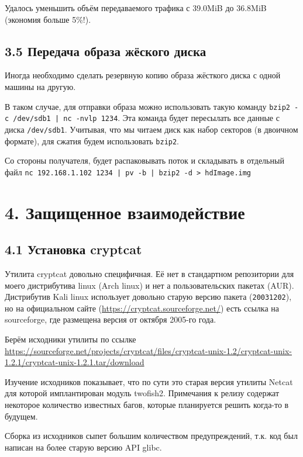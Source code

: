 Удалось уменьшить объём передаваемого трафика с 39.0MiB до 36.8MiB (экономия больше 5\%!).

\subsection*{3.5 Передача образа жёского диска}

Иногда необходимо сделать резервную копию образа жёсткого диска с одной машины на другую.

В таком случае, для отправки образа можно использовать такую команду \texttt{bzip2 -c /dev/sdb1 | nc -nvlp 1234}. Эта команда будет пересылать все данные с диска \texttt{/dev/sdb1}. Учитывая, что мы читаем диск как набор секторов (в двоичном формате), для сжатия будем использовать \texttt{bzip2}.

Со стороны получателя, будет распаковывать поток и складывать в отдельный файл \texttt{nc 192.168.1.102 1234 | pv -b | bzip2 -d > hdImage.img}

\section*{4. Защищенное взаимодействие}

\subsection*{4.1 Установка cryptcat}

Утилита cryptcat довольно специфичная. Её нет в стандартном репозитории для моего дистрибутива linux (Arch linux) и нет а пользовательских пакетах (AUR). Дистрибутив Kali linux использует довольно старую версию пакета (\texttt{20031202}), но на официальном сайте (\url{https://cryptcat.sourceforge.net/}) есть ссылка на sourceforge, где размещена версия от октября 2005-го года.

Берём исходники утилиты по ссылке
\url{https://sourceforge.net/projects/cryptcat/files/cryptcat-unix-1.2/cryptcat-unix-1.2.1/cryptcat-unix-1.2.1.tar/download}

Изучение исходников показывает, что по сути это старая версия утилиты Netcat для которой имплантирован модуль twofish2. Примечания к релизу содержат некоторое количество известных багов, которые планируется решить когда-то в будущем.

Сборка из исходников сыпет большим количеством предупреждений, т.к. код был написан на более старую версию API glibc.

